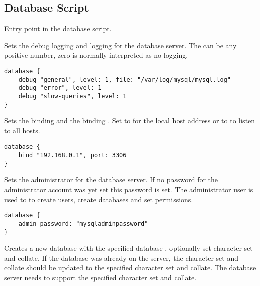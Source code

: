 \subsection{Database Script}



Entry point in the database script.


Sets the debug logging  and logging  for the database server. 
The  can be any positive number, zero is normally interpreted as no logging.

\begin{lstlisting}[style=Java]
database {
    debug "general", level: 1, file: "/var/log/mysql/mysql.log"
    debug "error", level: 1
    debug "slow-queries", level: 1
}
\end{lstlisting}


Sets the binding  and the binding . Set to 
for the local host address  or to  to listen to all
hosts.

\begin{lstlisting}[style=Java]
database {
    bind "192.168.0.1", port: 3306
}
\end{lstlisting}


Sets the administrator  for the database server. If no password for
the administrator account was yet set this password is set. The administrator 
user is used to to create users, create databases and set permissions.

\begin{lstlisting}[style=Java]
database {
    admin password: "mysqladminpassword"
}
\end{lstlisting}


Creates a new database with the specified database , 
optionally set character set and collate. If the database was already on 
the server, the character set and collate should be updated to the specified 
character set and collate. The database server needs to support 
the specified character set and collate.

